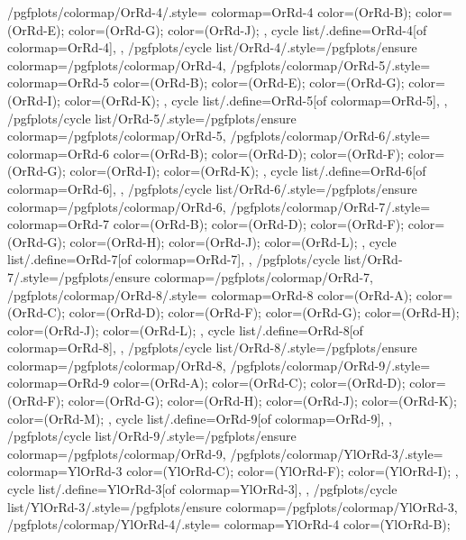 {  %
  /pgfplots/colormap/OrRd-4/.style={
    colormap={OrRd-4}{
      color=(OrRd-B);
      color=(OrRd-E);
      color=(OrRd-G);
      color=(OrRd-J);
    },
    cycle list/.define={OrRd-4}{[of colormap=OrRd-4]},
  },
  /pgfplots/cycle list/OrRd-4/.style={/pgfplots/ensure colormap={/pgfplots/colormap/OrRd-4}},
  /pgfplots/colormap/OrRd-5/.style={
    colormap={OrRd-5}{
      color=(OrRd-B);
      color=(OrRd-E);
      color=(OrRd-G);
      color=(OrRd-I);
      color=(OrRd-K);
    },
    cycle list/.define={OrRd-5}{[of colormap=OrRd-5]},
  },
  /pgfplots/cycle list/OrRd-5/.style={/pgfplots/ensure colormap={/pgfplots/colormap/OrRd-5}},
  /pgfplots/colormap/OrRd-6/.style={
    colormap={OrRd-6}{
      color=(OrRd-B);
      color=(OrRd-D);
      color=(OrRd-F);
      color=(OrRd-G);
      color=(OrRd-I);
      color=(OrRd-K);
    },
    cycle list/.define={OrRd-6}{[of colormap=OrRd-6]},
  },
  /pgfplots/cycle list/OrRd-6/.style={/pgfplots/ensure colormap={/pgfplots/colormap/OrRd-6}},
  /pgfplots/colormap/OrRd-7/.style={
    colormap={OrRd-7}{
      color=(OrRd-B);
      color=(OrRd-D);
      color=(OrRd-F);
      color=(OrRd-G);
      color=(OrRd-H);
      color=(OrRd-J);
      color=(OrRd-L);
    },
    cycle list/.define={OrRd-7}{[of colormap=OrRd-7]},
  },
  /pgfplots/cycle list/OrRd-7/.style={/pgfplots/ensure colormap={/pgfplots/colormap/OrRd-7}},
  /pgfplots/colormap/OrRd-8/.style={
    colormap={OrRd-8}{
      color=(OrRd-A);
      color=(OrRd-C);
      color=(OrRd-D);
      color=(OrRd-F);
      color=(OrRd-G);
      color=(OrRd-H);
      color=(OrRd-J);
      color=(OrRd-L);
    },
    cycle list/.define={OrRd-8}{[of colormap=OrRd-8]},
  },
  /pgfplots/cycle list/OrRd-8/.style={/pgfplots/ensure colormap={/pgfplots/colormap/OrRd-8}},
  /pgfplots/colormap/OrRd-9/.style={
    colormap={OrRd-9}{
      color=(OrRd-A);
      color=(OrRd-C);
      color=(OrRd-D);
      color=(OrRd-F);
      color=(OrRd-G);
      color=(OrRd-H);
      color=(OrRd-J);
      color=(OrRd-K);
      color=(OrRd-M);
    },
    cycle list/.define={OrRd-9}{[of colormap=OrRd-9]},
  },
  /pgfplots/cycle list/OrRd-9/.style={/pgfplots/ensure colormap={/pgfplots/colormap/OrRd-9}},
  /pgfplots/colormap/YlOrRd-3/.style={
    colormap={YlOrRd-3}{
      color=(YlOrRd-C);
      color=(YlOrRd-F);
      color=(YlOrRd-I);
    },
    cycle list/.define={YlOrRd-3}{[of colormap=YlOrRd-3]},
  },
  /pgfplots/cycle list/YlOrRd-3/.style={/pgfplots/ensure colormap={/pgfplots/colormap/YlOrRd-3}},
  /pgfplots/colormap/YlOrRd-4/.style={
    colormap={YlOrRd-4}{
      color=(YlOrRd-B);
}}}

